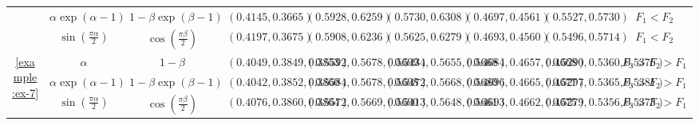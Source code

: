 \begin{table}[tbh!]
{\begin{tabular}{ccccccccc}
		 & $\alpha \exp(\alpha - 1)$ & $1 - \beta \exp(\beta - 1)$ & $(0.4145, 0.3665)$ & $(0.5928, 0.6259)$ & $(0.5730, 0.6308)$ & $(0.4697, 0.4561)$ & $(0.5527, 0.5730)$ & $F_{1} < F_{2}$ \\
		 & $\sin\left(\frac{\pi \alpha}{2}\right)$ & $\cos\left(\frac{\pi \beta}{2}\right)$ & $(0.4197, 0.3675)$ & $(0.5908, 0.6236)$ & $(0.5625, 0.6279)$ & $(0.4693, 0.4560)$ & $(0.5496, 0.5714)$ & $F_{1} < F_{2}$ \\
		\midrule
		\multirow{3}{*}{\ref{example:ex-7}} & $\alpha$ & $1 - \beta$ & $(0.4049, 0.3849, 0.3853)$ & $(0.5592, 0.5678, 0.5699)$ & $(0.5434, 0.5655, 0.5668)$ & $(0.4684, 0.4657, 0.4668)$ & $(0.5290, 0.5360, 0.5376)$ & $F_{3} > F_{2} > F_{1}$ \\
		 & $\alpha \exp(\alpha - 1)$ & $1 - \beta \exp(\beta - 1)$ & $(0.4042, 0.3852, 0.3860)$ & $(0.5584, 0.5678, 0.5698)$ & $(0.5472, 0.5668, 0.5680)$ & $(0.4696, 0.4665, 0.4677)$ & $(0.5297, 0.5365, 0.5381)$ & $F_{3} > F_{2} > F_{1}$ \\
		 & $\sin\left(\frac{\pi \alpha}{2}\right)$ & $\cos\left(\frac{\pi \beta}{2}\right)$ & $(0.4076, 0.3860, 0.3864)$ & $(0.5572, 0.5669, 0.5690)$ & $(0.5413, 0.5648, 0.5661)$ & $(0.4693, 0.4662, 0.4675)$ & $(0.5279, 0.5356, 0.5373)$ & $F_{3} > F_{2} > F_{1}$ \\
		\bottomrule
	\end{tabular}}
\end{table}